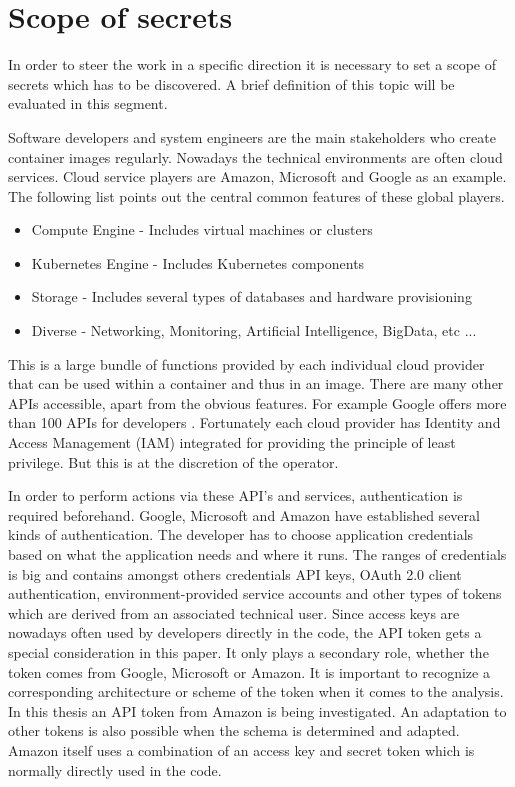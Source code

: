 \section{Scope of secrets}
\label{ch:theory:scope_secrets}
In order to steer the work in a specific direction it is necessary to set a scope of secrets which has to be discovered. 
A brief definition of this topic will be evaluated in this segment.

Software developers and system engineers are the main stakeholders who create container images regularly. 
Nowadays the technical environments are often cloud services. 
Cloud service players are Amazon, Microsoft and Google as an example. 
The following list points out the central common features of these global players.
\begin{itemize}
\item Compute Engine - Includes virtual machines or clusters
\item Kubernetes Engine - Includes Kubernetes components
\item Storage - Includes several types of databases and hardware provisioning
\item Diverse - Networking, Monitoring, Artificial Intelligence, BigData, etc ...
\end{itemize}

This is a large bundle of functions provided by each individual cloud provider that can be used within a container and thus in an image.
There are many other APIs accessible, apart from the obvious features. For example Google offers more than 100 APIs for developers \cite{gapi}.
Fortunately each cloud provider has Identity and Access Management (IAM) integrated for providing the principle of least privilege. 
But this is at the discretion of the operator.

In order to perform actions via these API's and services, authentication is required beforehand. 
Google, Microsoft and Amazon have established several kinds of authentication. 
The developer has to choose application credentials based on what the application needs and where it runs.
The ranges of credentials is big and contains amongst others credentials API keys, OAuth 2.0 client authentication, environment-provided service accounts and other types of tokens which are derived from an associated technical user.
Since access keys are nowadays often used by developers directly in the code, the API token gets a special consideration in this paper.
It only plays a secondary role, whether the token comes from Google, Microsoft or Amazon. 
It is important to recognize a corresponding architecture or scheme of the token when it comes to the analysis.
In this thesis an API token from Amazon is being investigated. An adaptation to other tokens is also possible when the schema is determined and adapted.
Amazon itself uses a combination of an access key and secret token which is normally directly used in the code.

